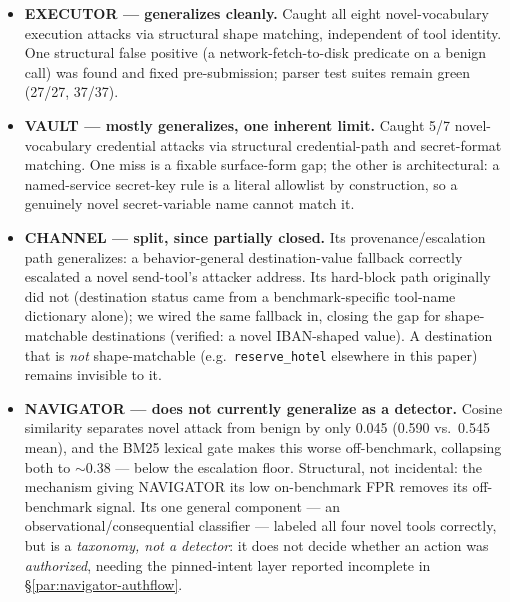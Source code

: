 \begin{itemize}
\item \textbf{EXECUTOR --- generalizes cleanly.} Caught all eight
novel-vocabulary execution attacks via structural shape matching,
independent of tool identity. One structural false positive (a
network-fetch-to-disk predicate on a benign call) was found and fixed
pre-submission; parser test suites remain green (27/27, 37/37).
\item \textbf{VAULT --- mostly generalizes, one inherent limit.} Caught
5/7 novel-vocabulary credential attacks via structural credential-path and
secret-format matching. One miss is a fixable surface-form gap; the other
is architectural: a named-service secret-key rule is a literal allowlist
by construction, so a genuinely novel secret-variable name cannot match
it.
\item \textbf{CHANNEL --- split, since partially closed.} Its
provenance/escalation path generalizes: a behavior-general
destination-value fallback correctly escalated a novel send-tool's
attacker address. Its hard-block path originally did not (destination
status came from a benchmark-specific tool-name dictionary alone); we
wired the same fallback in, closing the gap for shape-matchable
destinations (verified: a novel IBAN-shaped value). A destination that is
\emph{not} shape-matchable (e.g.\ \texttt{reserve\_hotel} elsewhere in
this paper) remains invisible to it.
\item \textbf{NAVIGATOR --- does not currently generalize as a detector.}
Cosine similarity separates novel attack from benign by only 0.045 (0.590
vs.\ 0.545 mean), and the BM25 lexical gate makes this worse off-benchmark,
collapsing both to $\sim$0.38 --- below the escalation floor. Structural,
not incidental: the mechanism giving NAVIGATOR its low on-benchmark FPR
removes its off-benchmark signal. Its one general component --- an
observational/consequential classifier --- labeled all four novel tools
correctly, but is a \emph{taxonomy, not a detector}: it does not decide
whether an action was \emph{authorized}, needing the pinned-intent layer
reported incomplete in \S\ref{par:navigator-authflow}.
\end{itemize}

